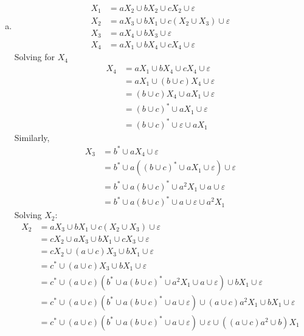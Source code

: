 \begin{solution}
    \begin{enumerate}[(a)]
        \item 
        
        \begin{align*}
            X_1 &= aX_2\cup bX_2\cup cX_2\cup\varepsilon\\
            X_2 &= aX_3\cup bX_1 \cup c(X_2\cup X_3)\cup\varepsilon\\
            X_3 &= aX_4\cup bX_3\cup\varepsilon\\
            X_4 &= aX_1\cup bX_4\cup cX_4\cup\varepsilon  
        \end{align*}
        Solving for $X_4$ 
        \begin{align*}
            X_4 &= aX_1\cup bX_4\cup cX_4\cup\varepsilon\\
                &= aX_1\cup (b\cup c)X_4\cup\varepsilon\\
                &= (b\cup c)X_4\cup aX_1\cup\varepsilon\\
                &= (b\cup c)^*\cup aX_1\cup\varepsilon\\
                &= (b\cup c)^*\cup\varepsilon\cup aX_1
        \end{align*}
    Similarly, 
        \begin{align*}
            X_3 &= b^*\cup aX_4\cup\varepsilon\\
                &= b^*\cup a((b\cup c)^*\cup aX_1\cup\varepsilon)\cup\varepsilon\\
                &= b^*\cup a(b\cup c)^*\cup a^2X_1\cup a\cup\varepsilon\\
                &= b^*\cup a(b\cup c)^*\cup a\cup\varepsilon\cup a^2X_1
        \end{align*}
    Solving $X_2$:
    \begin{align*}
        X_2 &= aX_3\cup bX_1 \cup c(X_2\cup X_3)\cup\varepsilon\\
            &= cX_2\cup aX_3\cup bX_1 \cup cX_3\cup\varepsilon\\
            &= cX_2\cup (a\cup c)X_3\cup bX_1\cup\varepsilon\\
            &= c^*\cup (a\cup c)X_3\cup bX_1\cup\varepsilon\\
            &= c^*\cup (a\cup c)(b^*\cup a(b\cup c)^*\cup a^2X_1\cup a\cup\varepsilon)\cup bX_1\cup\varepsilon\\
            &= c^*\cup (a\cup c)(b^*\cup a(b\cup c)^*\cup a\cup\varepsilon)\cup(a\cup c)a^2X_1\cup bX_1\cup\varepsilon\\
            &= c^*\cup (a\cup c)(b^*\cup a(b\cup c)^*\cup a\cup\varepsilon)\cup\varepsilon\cup((a\cup c)a^2\cup b)X_1
    \end{align*}


\end{enumerate}
\end{solution}
